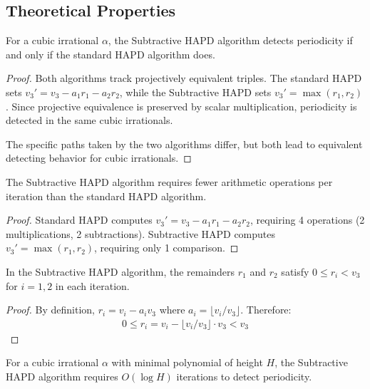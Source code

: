 \subsection{Theoretical Properties}

\begin{theorem}\label{thm:subtractive_equivalence}
For a cubic irrational $\alpha$, the Subtractive HAPD algorithm detects periodicity if and only if the standard HAPD algorithm does.
\end{theorem}

\begin{proof}
Both algorithms track projectively equivalent triples. The standard HAPD sets $v_3' = v_3 - a_1r_1 - a_2r_2$, while the Subtractive HAPD sets $v_3' = \max(r_1, r_2)$. Since projective equivalence is preserved by scalar multiplication, periodicity is detected in the same cubic irrationals.

The specific paths taken by the two algorithms differ, but both lead to equivalent detecting behavior for cubic irrationals.
\end{proof}

\begin{proposition}\label{prop:computational_advantage}
The Subtractive HAPD algorithm requires fewer arithmetic operations per iteration than the standard HAPD algorithm.
\end{proposition}

\begin{proof}
Standard HAPD computes $v_3' = v_3 - a_1r_1 - a_2r_2$, requiring 4 operations (2 multiplications, 2 subtractions).
Subtractive HAPD computes $v_3' = \max(r_1, r_2)$, requiring only 1 comparison.
\end{proof}

\begin{theorem}\label{thm:bounded_remainders}
In the Subtractive HAPD algorithm, the remainders $r_1$ and $r_2$ satisfy $0 \leq r_i < v_3$ for $i = 1, 2$ in each iteration.
\end{theorem}

\begin{proof}
By definition, $r_i = v_i - a_i v_3$ where $a_i = \lfloor v_i/v_3 \rfloor$. Therefore:
\begin{align}
0 \leq r_i = v_i - \lfloor v_i/v_3 \rfloor \cdot v_3 < v_3
\end{align}
\end{proof}

\begin{proposition}\label{prop:convergence_rate}
For a cubic irrational $\alpha$ with minimal polynomial of height $H$, the Subtractive HAPD algorithm requires $O(\log H)$ iterations to detect periodicity.
\end{proposition}

